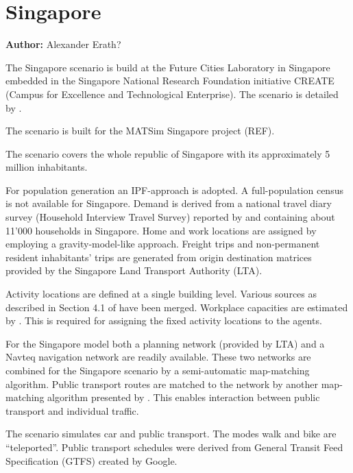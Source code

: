 \section{Singapore}
\label{ch:scenarios:singapore}
\hfill \textbf{Author:} Alexander Erath?

The Singapore scenario is build at the Future Cities Laboratory in Singapore embedded in the Singapore National Research Foundation initiative CREATE (Campus for Excellence and Technological Enterprise). The scenario is detailed by \citet[][]{ErathEtAl_TechRep_FCL_forth, Erath_unpub_UniSeoul_2011}.

The scenario is built for the MATSim Singapore project (REF).

The scenario covers the whole republic of Singapore with its approximately 5 million inhabitants.

For population generation an IPF-approach is adopted. A full-population census is not available for Singapore. Demand is derived from a national travel diary survey (Household Interview Travel Survey) reported by \citet[][]{Choi_JOUR_2010} and containing about 11'000 households in Singapore. Home and work locations are assigned by employing a gravity-model-like approach. Freight trips and non-permanent resident inhabitants' trips are generated from origin destination matrices provided by the Singapore Land Transport Authority (LTA).

Activity locations are defined at a single building level. Various sources as described in Section 4.1 of \citet[][]{ErathEtAl_TechRep_FCL_forth} have been merged. Workplace capacities are estimated by \citet[][]{OrdonezErath_TRR_2013}. This is required for assigning the fixed activity locations to the agents.

For the Singapore model both a planning network (provided by LTA) and a Navteq navigation network are readily available. These two networks are combined for the Singapore scenario by a semi-automatic map-matching algorithm. Public transport routes are matched to the network by another map-matching algorithm presented by \citet[][]{Ordonez_HKSTS_2011, Ordonez_Webpage_2011_4}. This enables interaction between public transport and individual traffic.

The scenario simulates car and public transport. The modes walk and bike are ``teleported''. Public transport schedules were derived from General Transit Feed Specification (GTFS) created by Google.

